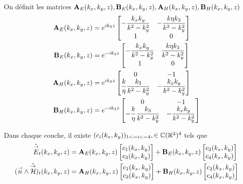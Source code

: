         \begin{defn}
            On définit les matrices \(\mathbf{A}_{E}(k_x,k_y,z),\mathbf{B}_{E}(k_x,k_y,z),\mathbf{A}_{H}(k_x,k_y,z),\mathbf{B}_{H}(k_x,k_y,z)\)
            \begin{align}
              \mathbf{A}_{E}(k_x,k_y,z) &= e^{ik_3z}
              \begin{bmatrix}
                -\dfrac{k_xk_y}{k^2 - k_y^2} & -\dfrac{k\eta k_3}{k^2 - k_y^2}
                \\
                1 & 0
              \end{bmatrix}
              \\
              \mathbf{B}_{E}(k_x,k_y,z) &= e^{-ik_3z}
              \begin{bmatrix}
                -\dfrac{k_xk_y}{k^2 - k_y^2} & \dfrac{k\eta k_3}{k^2 - k_y^2}
                \\
                1 & 0
              \end{bmatrix}
              \\
              \mathbf{A}_{H}(k_x,k_y,z) &= e^{ik_3z}
              \begin{bmatrix}
                0 & -1
                \\
                \dfrac{k}{\eta}\dfrac{k_3}{k^2 - k_y^2} & -\dfrac{k_xk_y}{k^2 - k_y^2}
              \end{bmatrix}
              \\
              \mathbf{B}_{H}(k_x,k_y,z) &= e^{-ik_3z}
              \begin{bmatrix}
                0 & -1
                \\
                -\dfrac{k}{\eta}\dfrac{k_3}{k^2 - k_y^2} & -\dfrac{k_xk_y}{k^2 - k_y^2}
              \end{bmatrix}
            \end{align}
        \end{defn}

        \begin{prop}
            Dans chaque couche, il existe \((c_i(k_x,k_y))_{1<=i<=4}, \in \mathbb C(\mathbb R^2)^4\) tels que
            \begin{align}
                \hat{{\overset{\rightarrow}{E}}}_t(k_x,k_y,z) &= \mathbf{A}_E(k_x,k_y,z) \begin{bmatrix}c_1(k_x,k_y) \\ c_3(k_x,k_y)\end{bmatrix} + \mathbf{B}_E(k_x,k_y,z) \begin{bmatrix}c_2(k_x,k_y) \\ c_4(k_x,k_y)\end{bmatrix}
                \\
                ({\overset{\rightarrow}{n}} \wedge \hat{{\overset{\rightarrow}{\mathcal{H}}}})_t(k_x,k_y,z) &= \mathbf{A}_H(k_x,k_y,z) \begin{bmatrix}c_1(k_x,k_y) \\ c_3(k_x,k_y)\end{bmatrix} + \mathbf{B}_H(k_x,k_y,z) \begin{bmatrix}c_2(k_x,k_y) \\ c_4(k_x,k_y)\end{bmatrix}
            \end{align}
        \end{prop}

